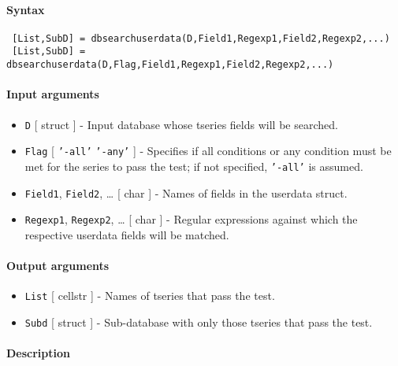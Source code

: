 


	\paragraph{Syntax}
 
 \begin{verbatim}
 [List,SubD] = dbsearchuserdata(D,Field1,Regexp1,Field2,Regexp2,...)
 [List,SubD] = dbsearchuserdata(D,Flag,Field1,Regexp1,Field2,Regexp2,...)
 \end{verbatim}
 
 \paragraph{Input arguments}
 
 \begin{itemize}
 \item
   \texttt{D} {[} struct {]} - Input database whose tseries fields will
   be searched.
 \item
   \texttt{Flag} {[} \texttt{'-all'} \textbar{} \texttt{'-any'} {]} -
   Specifies if all conditions or any condition must be met for the
   series to pass the test; if not specified, \texttt{'-all'} is assumed.
 \item
   \texttt{Field1}, \texttt{Field2}, \ldots{} {[} char {]} - Names of
   fields in the userdata struct.
 \item
   \texttt{Regexp1}, \texttt{Regexp2}, \ldots{} {[} char {]} - Regular
   expressions against which the respective userdata fields will be
   matched.
 \end{itemize}
 
 \paragraph{Output arguments}
 
 \begin{itemize}
 \item
   \texttt{List} {[} cellstr {]} - Names of tseries that pass the test.
 \item
   \texttt{Subd} {[} struct {]} - Sub-database with only those tseries
   that pass the test.
 \end{itemize}
 
 \paragraph{Description}
 
